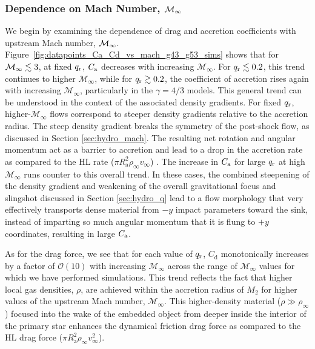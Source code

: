 \subsubsection{Dependence on Mach Number, ${\cal M}_\infty$}\label{sec:coeff_mach}

We begin by examining the dependence of drag and accretion coefficients with upstream Mach number, ${\cal M}_\infty$. 
Figure~\ref{fig:datapoints_Ca_Cd_vs_mach_g43_g53_sims} shows that for ${\cal M}_\infty \lesssim 3$, at fixed $q_{\rm r}$, $C_{\rm a}$ decreases with increasing $\mathcal{M}_\infty$. For $q_{\rm r}\lesssim0.2$, this trend continues to higher $\mathcal{M}_\infty$, while for $q_{\rm r} \gtrsim 0.2$, the coefficient of accretion rises again with increasing $\mathcal{M}_\infty$, particularly in the $\gamma=4/3$ models. This general trend can be understood in the context of the associated density gradients. For fixed $q_{\rm r}$, higher-$\mathcal{M}_\infty$ flows correspond to steeper density gradients relative to the accretion radius. The steep density gradient breaks the symmetry of the post-shock flow, as discussed in Section \ref{sec:hydro_mach}. The resulting net rotation and  angular momentum act as a barrier to accretion and lead to a drop in the accretion rate as compared to the HL rate ($\pi R_{\mathrm{a}}^2 \rho_\infty v_\infty$) \cite{MacLeod_2015}. The increase in $C_{\rm a}$ for large $q_{\rm r}$ at high $\mathcal{M}_\infty$  runs counter to this overall trend. In these cases, the combined steepening of the density gradient and weakening of the overall gravitational focus and slingshot discussed in Section \ref{sec:hydro_q} lead to a flow morphology that very effectively transports dense material from $-y$ impact parameters toward the sink, instead of imparting so much angular momentum that it is flung to $+y$ coordinates, resulting in large $C_{\rm a}$.

As for the drag force, we see that for each value of $q_{\rm r}$, $C_{\mathrm d}$ monotonically increases by a factor of $\mathcal{O}(10)$ with increasing $\mathcal{M}_\infty$ across the range of $\mathcal{M}_\infty$ values for which we have performed simulations. This trend reflects the fact that higher local gas densities, $\rho$, are achieved within the accretion radius of $M_2$ for higher values of the upstream Mach number, $\mathcal{M}_\infty$. This higher-density material ($\rho \gg \rho_\infty$) focused into the wake of the embedded object from deeper inside the interior of the primary star enhances the dynamical friction drag force as compared to the HL drag force ($\pi R_{\mathrm{a}}^2 \rho_\infty v_\infty^2$).


